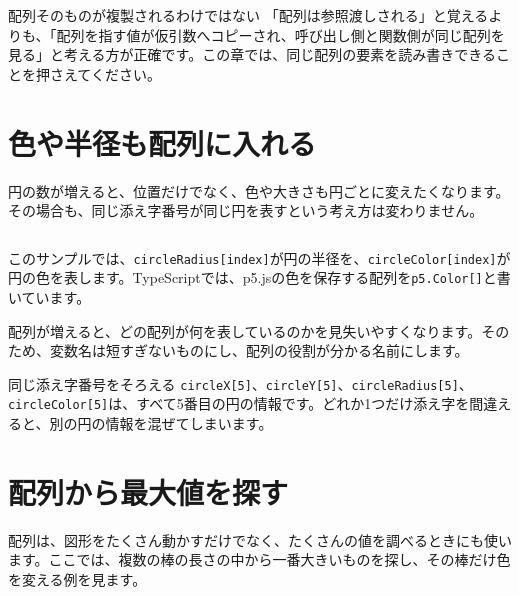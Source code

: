 \begin{notebox}{配列そのものが複製されるわけではない}
「配列は参照渡しされる」と覚えるよりも、「配列を指す値が仮引数へコピーされ、呼び出し側と関数側が同じ配列を見る」と考える方が正確です。この章では、同じ配列の要素を読み書きできることを押さえてください。
\end{notebox}

\section{色や半径も配列に入れる}

円の数が増えると、位置だけでなく、色や大きさも円ごとに変えたくなります。その場合も、同じ添え字番号が同じ円を表すという考え方は変わりません。

\begin{listing}[htbp]
\inputminted{ts}{typescript-p5/listings/chapter10/colored-circles-arrays.ts}
\caption{色と半径も配列で管理する（\texttt{chapter10/colored-circles-arrays.ts}）}
\label{lst:chapter10-colored-circles-arrays}
\end{listing}

このサンプルでは、\texttt{circleRadius[index]}が円の半径を、\texttt{circleColor[index]}が円の色を表します。TypeScriptでは、p5.jsの色を保存する配列を\texttt{p5.Color[]}と書いています。

配列が増えると、どの配列が何を表しているのかを見失いやすくなります。そのため、変数名は短すぎないものにし、配列の役割が分かる名前にします。

\begin{pointbox}{同じ添え字番号をそろえる}
\texttt{circleX[5]}、\texttt{circleY[5]}、\texttt{circleRadius[5]}、\texttt{circleColor[5]}は、すべて5番目の円の情報です。どれか1つだけ添え字を間違えると、別の円の情報を混ぜてしまいます。
\end{pointbox}

\section{配列から最大値を探す}

配列は、図形をたくさん動かすだけでなく、たくさんの値を調べるときにも使います。ここでは、複数の棒の長さの中から一番大きいものを探し、その棒だけ色を変える例を見ます。

\begin{listing}[htbp]
\inputminted{ts}{typescript-p5/listings/chapter10/max-value-bars.ts}
\caption{配列から最大値の位置を探す（\texttt{chapter10/max-value-bars.ts}）}
\label{lst:chapter10-max-value-bars}
\end{listing}

